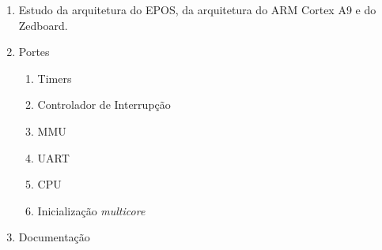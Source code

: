 \begin{enumerate}
    \item Estudo da arquitetura do EPOS, da arquitetura do ARM Cortex A9 e do Zedboard.
    \item Portes
    \begin{enumerate}
        \item Timers
        \item Controlador de Interrupção
        \item MMU
		\item UART
		\item CPU
		\item Inicialização \emph{multicore}
    \end{enumerate}
    \item Documentação
\end{enumerate}

